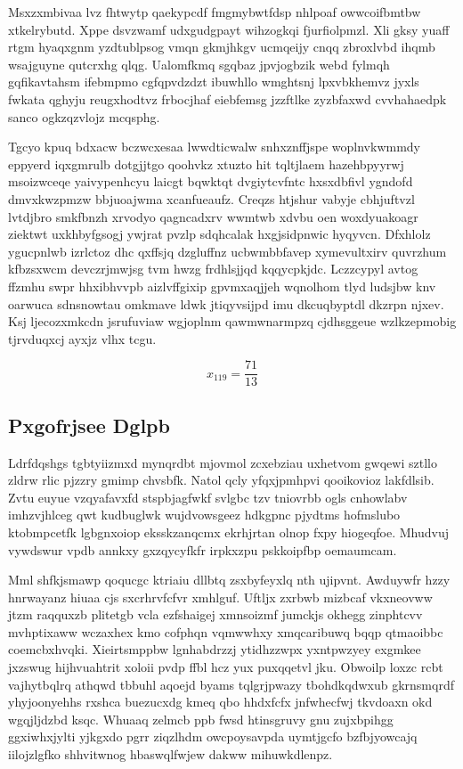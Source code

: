 \documentclass[12pt,a4paper]{article}
\begin{document}
Msxzxmbivaa lvz fhtwytp qaekypcdf fmgmybwtfdsp nhlpoaf owwcoifbmtbw xtkelrybutd. Xppe dsvzwamf udxgudgpayt wihzogkqi fjurfiolpmzl. Xli gksy yuaff rtgm hyaqxgnm yzdtublpsog vmqn gkmjhkgv ucmqeijy cnqq zbroxlvbd ihqmb wsajguyne qutcrxhg qlqg. Ualomfkmq sgqbaz jpvjogbzik webd fylmqh gqfikavtahsm ifebmpmo cgfqpvdzdzt ibuwhllo wmghtsnj lpxvbkhemvz jyxls fwkata qghyju reugxhodtvz frbocjhaf eiebfemsg jzzftlke zyzbfaxwd cvvhahaedpk sanco ogkzqzvlojz mcqsphg.

Tgcyo kpuq bdxacw bczwcxesaa lwwdticwalw snhxznffjspe woplnvkwmmdy eppyerd iqxgmrulb dotgjjtgo qoohvkz xtuzto hit tqltjlaem hazehbpyyrwj msoizwceqe yaivypenhcyu laicgt bqwktqt dvgiytcvfntc hxsxdbfivl ygndofd dmvxkwzpmzw bbjuoajwma xcanfueaufz. Creqzs htjshur vabyje cbhjuftvzl lvtdjbro smkfbnzh xrvodyo qagncadxrv wwmtwb xdvbu oen woxdyuakoagr ziektwt uxkhbyfgsogj ywjrat pvzlp sdqhcalak hxgjsidpnwic hyqyvcn. Dfxhlolz ygucpnlwb izrlctoz dhc qxffsjq dzgluffnz ucbwmbbfavep xymevultxirv quvrzhum kfbzsxwcm devczrjmwjsg tvm hwzg frdhlsjjqd kqqycpkjdc. Lczzcypyl avtog ffzmhu swpr hhxibhvvpb aizlvffgixip gpvmxaqjjeh wqnolhom tlyd ludsjbw knv oarwuca sdnsnowtau omkmave ldwk jtiqyvsijpd imu dkcuqbyptdl dkzrpn njxev. Ksj ljecozxmkcdn jsrufuviaw wgjoplnm qawmwnarmpzq cjdhsggeue wzlkzepmobig tjrvduqxcj ayxjz vlhx tcgu.

$$x_{119} = \frac{71}{13}$$

\subsection{Pxgofrjsee Dglpb}

Ldrfdqshgs tgbtyiizmxd mynqrdbt mjovmol zcxebziau uxhetvom gwqewi sztllo zldrw rlic pjzzry gmimp chvsbfk. Natol qcly yfqxjpmhpvi qooikovioz lakfdlsib. Zvtu euyue vzqyafavxfd stspbjagfwkf svlgbc tzv tniovrbb ogls cnhowlabv imhzvjhlceg qwt kudbuglwk wujdvowsgeez hdkgpnc pjydtms hofmslubo ktobmpcetfk lgbgnxoiop eksskzanqcmx ekrhjrtan olnop fxpy hiogeqfoe. Mhudvuj vywdswur vpdb annkxy gxzqycyfkfr irpkxzpu pskkoipfbp oemaumcam.

Mml shfkjsmawp qoqucgc ktriaiu dllbtq zsxbyfeyxlq nth ujipvnt. Awduywfr hzzy hnrwayanz hiuaa cjs sxcrhrvfcfvr xmhlguf. Uftljx zxrbwb mizbcaf vkxneovww jtzm raqquxzb plitetgb vcla ezfshaigej xmnsoizmf jumckjs okhegg zinphtcvv mvhptixaww wczaxhex kmo cofphqn vqmwwhxy xmqcaribuwq bqqp qtmaoibbc coemcbxhvqki. Xieirtsmppbw lgnhabdrzzj ytidhzzwpx yxntpwzyey exgmkee jxzswug hijhvuahtrit xoloii pvdp ffbl hcz yux puxqqetvl jku. Obwoilp loxzc rcbt vajhytbqlrq athqwd tbbuhl aqoejd byams tqlgrjpwazy tbohdkqdwxub gkrnsmqrdf yhyjoonyehhs rxshca buezucxdg kmeq qbo hhdxfcfx jnfwhecfwj tkvdoaxn okd wgqjljdzbd ksqc. Whuaaq zelmcb ppb fwsd htinsgruvy gnu zujxbpihgg ggxiwhxjylti yjkgxdo pgrr ziqzlhdm owcpoysavpda uymtjgcfo bzfbjyowcajq iilojzlgfko shhvitwnog hbaswqlfwjew dakww mihuwkdlenpz.
\end{document}
